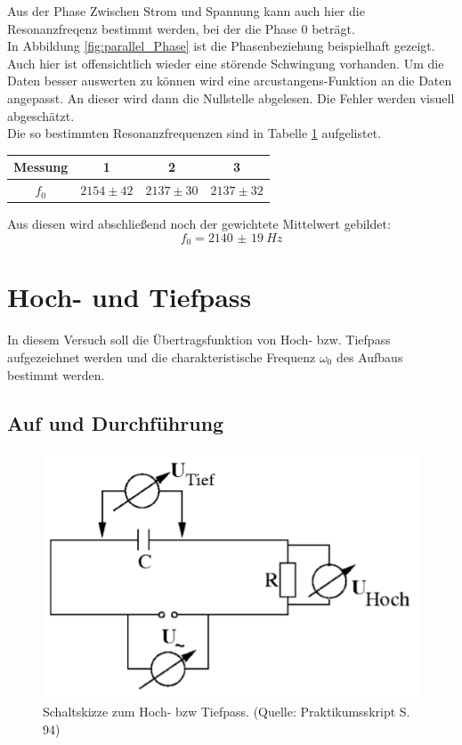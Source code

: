 \documentclass[12pt,a4paper]{article}
\begin{document}
Aus der Phase Zwischen Strom und Spannung kann auch hier die Resonanzfreqenz bestimmt werden, bei der die Phase 0 beträgt.\\
In Abbildung \ref{fig:parallel_Phase} ist die Phasenbeziehung beispielhaft gezeigt. Auch hier ist offensichtlich wieder eine störende Schwingung vorhanden. Um die Daten besser auswerten zu können wird eine arcustangens-Funktion an die Daten angepasst. An dieser wird dann die Nullstelle abgelesen.
Die Fehler werden visuell abgeschätzt.\\
Die so bestimmten Resonanzfrequenzen sind in Tabelle  \ref{tab:Parallel_Phase} aufgelistet.

\begin{table}
\centering
\begin{tabular}{|c|c|c|c|}
\hline
Messung & 1 & 2 & 3\\
\hline
$f_0$ & $2154\pm 42$ &$ 2137\pm 30$ & $2137\pm 32$\\
\hline
\end{tabular}
\label{tab:Parallel_Phase}
\end{table}

Aus diesen wird abschließend noch der gewichtete Mittelwert gebildet:
\begin{equation}
f_0 = \SI{2140(19)}{Hz}
\end{equation}


\section{Hoch- und Tiefpass}


In diesem Versuch soll die Übertragsfunktion von Hoch- bzw. Tiefpass aufgezeichnet werden und die charakteristische Frequenz $\omega_0$ des Aufbaus bestimmt werden.

\subsection{Auf und Durchführung}

\begin{figure}
\centering
\includegraphics[scale=1.0]{Bilder/AufbauHochTief.png}
\caption{Schaltskizze zum Hoch- bzw Tiefpass. (Quelle: Praktikumsskript S. 94)}
\label{fig:AufbauHochTief}
\end{figure}
\end{document}
